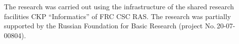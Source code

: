 




\vspace*{-14pt}

\Ack

\vspace*{-2pt}


\noindent
The research was carried out using the infrastructure of the shared research facilities CKP 
``Informatics'' of FRC CSC RAS. The research was partially supported by the Russian Foundation for Basic Research (project No.\,20-07-00804).



